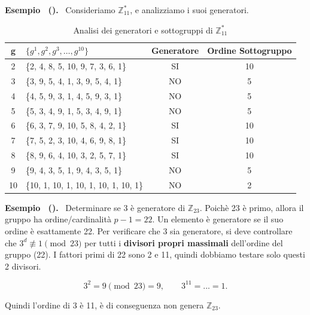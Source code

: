 \documentclass[a4paper, 11pt]{article}
\newenvironment{example}[1][]{
  \par\noindent\textbf{Esempio%
  \if\relax\detokenize{#1}\relax\else\ (\textbf{#1})\fi.}\ }{}
\begin{document}
\begin{example}
    Consideriamo $\mathbb{Z}_{11}^*$, e analizziamo i suoi generatori.
    \begin{table}[h]
    \centering
        \renewcommand{\arraystretch}{1.2}
        \begin{tabular}{|c|l|c|c|}
        \hline
        \textbf{g} & \textbf{$\{g^1, g^2, g^3, \dots, g^{10}\}$} & \textbf{Generatore} & \textbf{Ordine Sottogruppo} \\ \hline
        2 & \{2, 4, 8, 5, 10, 9, 7, 3, 6, 1\} & SI & 10 \\ \hline
        3 & \{3, 9, 5, 4, 1, 3, 9, 5, 4, 1\} & NO & 5 \\ \hline
        4 & \{4, 5, 9, 3, 1, 4, 5, 9, 3, 1\} & NO & 5 \\ \hline
        5 & \{5, 3, 4, 9, 1, 5, 3, 4, 9, 1\} & NO & 5 \\ \hline
        6 & \{6, 3, 7, 9, 10, 5, 8, 4, 2, 1\} & SI & 10 \\ \hline
        7 & \{7, 5, 2, 3, 10, 4, 6, 9, 8, 1\} & SI & 10 \\ \hline
        8 & \{8, 9, 6, 4, 10, 3, 2, 5, 7, 1\} & SI  & 10 \\ \hline
        9 & \{9, 4, 3, 5, 1, 9, 4, 3, 5, 1\} & NO  & 5 \\ \hline
        10 & \{10, 1, 10, 1, 10, 1, 10, 1, 10, 1\} & NO & 2 \\ \hline
        \end{tabular}
    \caption{Analisi dei generatori e sottogruppi di $\mathbb{Z}_{11}^*$}
    \end{table}
\end{example}

\begin{example}
    Determinare se 3 è generatore di $\mathbb{Z}_{23}$. Poichè 23 è primo, allora il gruppo ha ordine/cardinalità $p - 1 = 22$. Un elemento è generatore se il suo ordine è esattamente 22. Per verificare che 3 sia generatore, si deve controllare che $3^d \not\equiv 1 \pmod {23}$ per tutti i \textbf{divisori propri massimali} dell'ordine del gruppo (22). I fattori primi di 22 sono 2 e 11, quindi dobbiamo testare solo questi 2 divisori.

    \[
        3^2 = 9 \pmod {23} = 9, \qquad 3^{11} = ... = 1.
    \]

    Quindi l'ordine di 3 è 11, è di conseguenza non genera $\mathbb{Z}_{23}$.

\end{example}
\end{document}
